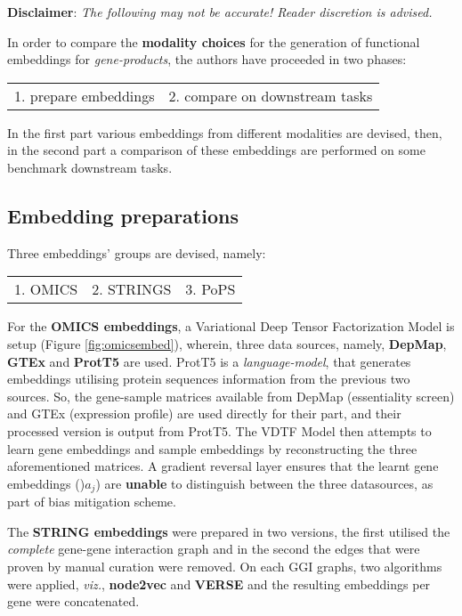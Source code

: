 \begin{sloppypar*}

    \begin{warning}
        \textbf{Disclaimer}: \textit{The following may not be accurate! Reader
        discretion is advised.}
    \end{warning}

    \noindent In order to compare the \textbf{modality choices} for the generation
    of functional embeddings for \textit{gene-products}, the authors have proceeded
    in two phases: \hfill\break
    \begin{tabularx}{\textwidth}{XX}
        1. prepare embeddings & 2. compare on downstream tasks
    \end{tabularx} \hfill\break
    In the first part various embeddings from different modalities are devised, 
    then, in the second part a comparison of these embeddings are performed on
    some benchmark downstream tasks.

    \subsection{Embedding preparations}
    \noindent Three embeddings' groups are devised, namely:

    \begin{tabularx}{\textwidth}{XXX}
        1. OMICS & 2. STRINGS & 3. PoPS
    \end{tabularx} \hfill\break
    \noindent For the \textbf{OMICS embeddings}, a Variational Deep Tensor Factorization
    Model is setup (Figure \ref{fig:omicsembed}), wherein, three data sources,
    namely, \textbf{DepMap}, \textbf{GTEx} and \textbf{ProtT5} are used. ProtT5
    \cite{protTrans} is a \textit{language-model}, that generates embeddings
    utilising protein sequences information from the previous two sources. So,
    the gene-sample matrices available from DepMap (essentiality screen) and
    GTEx (expression profile) are used directly for their part, and their processed
    version is output from ProtT5. The VDTF Model then attempts to learn gene
    embeddings and sample embeddings by reconstructing the three aforementioned
    matrices. A gradient reversal layer \cite{revGrad} ensures that the learnt
    gene embeddings ()$a_j$) are \textbf{unable} to distinguish between the three
    datasources, as part of bias mitigation scheme. \hfill\break

    \noindent The \textbf{STRING embeddings} were prepared in two versions, the
    first utilised the \textit{complete} gene-gene interaction graph and in the
    second the edges that were proven by manual curation were removed. On each
    GGI graphs, two algorithms were applied, \textit{viz.}, \textbf{node2vec}
    and \textbf{VERSE} and the resulting embeddings per gene were concatenated. \hfill\break


\end{sloppypar*}
